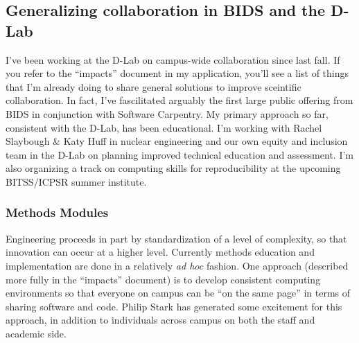 
\subsection*{Generalizing collaboration in BIDS and the D-Lab}

I've been working at the D-Lab on campus-wide collaboration since last fall. If
you refer to the “impacts” document in my application, you'll see a list of
things that I'm already doing to share general solutions to improve sceintific
collaboration. In fact, I've fascilitated arguably the first large public
offering from BIDS in conjunction with Software Carpentry. My primary approach
so far, consistent with the D-Lab, has been educational. I'm working with Rachel
Slaybough \& Katy Huff in nuclear engineering and our own equity and inclusion
team in the D-Lab on planning improved technical education and assessment. I'm
also organizing a track on computing skills for reproducibility at the upcoming
BITSS/ICPSR summer institute.

\subsubsection*{Methods Modules}

Engineering proceeds in part by standardization of a level of complexity, so
that innovation can occur at a higher level. Currently methods education and
implementation are done in a relatively \emph{ad hoc} fashion. One approach
(described more fully in the “impacts” document) is to develop consistent
computing environments so that everyone on campus can be “on the same page” in
terms of sharing software and code. Philip Stark has generated some excitement
for this approach, in addition to individuals across campus on both the staff
and academic side.

